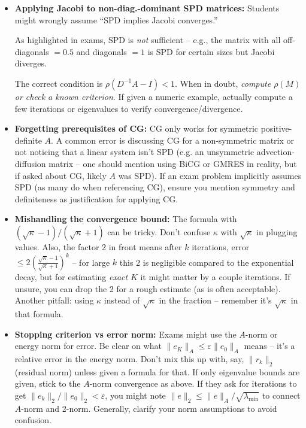 \documentclass[a4paper,11pt]{report}
\begin{document}
\begin{pitfalls}{}{}
    \begin{itemize}
        \item \textbf{Applying Jacobi to non-diag.-dominant SPD matrices:}
              Students might wrongly assume \enquote{SPD implies Jacobi converges.}

              As highlighted in exams, SPD is \textit{not} sufficient -- e.g., the matrix with all off-diagonals $=0.5$ and diagonals $=1$ is SPD for certain sizes but Jacobi diverges.

              The correct condition is $\rho(D^{-1}A - I)<1$. When in doubt, \textit{compute $\rho(M)$ or check a known criterion}. If given a numeric example, actually compute a few iterations or eigenvalues to verify convergence/divergence.
        \item \textbf{Forgetting prerequisites of CG:} CG only works for symmetric positive-definite $A$. A common error is discussing CG for a non-symmetric matrix or not noticing that a linear system isn't SPD (e.g. an unsymmetric advection-diffusion matrix -- one should mention using BiCG or GMRES in reality, but if asked about CG, likely $A$ was SPD). If an exam problem implicitly assumes SPD (as many do when referencing CG), ensure you mention symmetry and definiteness as justification for applying CG.
        \item \textbf{Mishandling the convergence bound:} The formula with $(\sqrt{\kappa}-1)/(\sqrt{\kappa}+1)$ can be tricky. Don't confuse $\kappa$ with $\sqrt{\kappa}$ in plugging values. Also, the factor 2 in front means after $k$ iterations, error $\le 2(\frac{\sqrt{\kappa}-1}{\sqrt{\kappa}+1})^k$ -- for large $k$ this 2 is negligible compared to the exponential decay, but for estimating \textit{exact} $K$ it might matter by a couple iterations. If unsure, you can drop the 2 for a rough estimate (as is often acceptable). Another pitfall: using $\kappa$ instead of $\sqrt{\kappa}$ in the fraction -- remember it's $\sqrt{\kappa}$ in that formula.
        \item \textbf{Stopping criterion vs error norm:} Exams might use the $A$-norm or energy norm for error. Be clear on what $\|e_K\|_A \le \varepsilon \|e_0\|_A$ means -- it's a relative error in the energy norm. Don't mix this up with, say, $\|r_k\|_2$ (residual norm) unless given a formula for that. If only eigenvalue bounds are given, stick to the $A$-norm convergence as above. If they ask for iterations to get $\|e_k\|_2/\|e_0\|_2 < \varepsilon$, you might note $\|e\|_2 \le \|e\|_A/\sqrt{\lambda_{\min}}$ to connect $A$-norm and 2-norm. Generally, clarify your norm assumptions to avoid confusion.
    \end{itemize}
\end{pitfalls}
\end{document}
